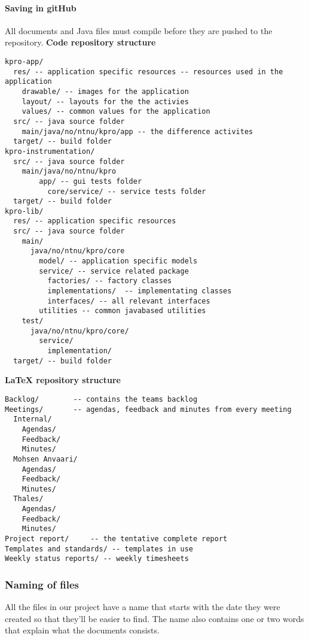 \paragraph{Saving in gitHub}
All documents and Java files must compile before they are pushed to the repository.\newline
\textbf{Code repository structure}
\begin{verbatim}
kpro-app/
  res/ -- application specific resources -- resources used in the application
    drawable/ -- images for the application
    layout/ -- layouts for the the activies
    values/ -- common values for the application
  src/ -- java source folder
    main/java/no/ntnu/kpro/app -- the difference activites
  target/ -- build folder
kpro-instrumentation/
  src/ -- java source folder
    main/java/no/ntnu/kpro
	    app/ -- gui tests folder
		  core/service/ -- service tests folder
  target/ -- build folder
kpro-lib/
  res/ -- application specific resources
  src/ -- java source folder
    main/
      java/no/ntnu/kpro/core
        model/ -- application specific models
        service/ -- service related package
          factories/ -- factory classes
          implementations/  -- implementating classes
          interfaces/ -- all relevant interfaces
        utilities -- common javabased utilities
    test/
      java/no/ntnu/kpro/core/
        service/
          implementation/
  target/ -- build folder

\end{verbatim}
\textbf{LaTeX repository structure}
\begin{verbatim}
Backlog/		-- contains the teams backlog
Meetings/		-- agendas, feedback and minutes from every meeting
  Internal/
    Agendas/
    Feedback/
    Minutes/
  Mohsen Anvaari/
    Agendas/
    Feedback/
    Minutes/
  Thales/
    Agendas/
    Feedback/
    Minutes/
Project report/		-- the tentative complete report
Templates and standards/ -- templates in use
Weekly status reports/ -- weekly timesheets

\end{verbatim}


\subsubsection{Naming of files}
All the files in our project have a name that starts with the date they were created so that they’ll be easier to find. The name also contains one or two words that explain what the documents consists.

